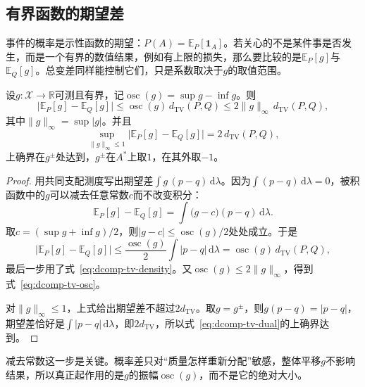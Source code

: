 \subsection{有界函数的期望差}
\label{sec:dcomp-tv-functions}

事件的概率是示性函数的期望：$P(A)=\mathbb{E}_{P}[\mathbf{1}_{A}]$。若关心的不是某件事是否发生，而是一个有界的数值结果，例如有上限的损失，那么要比较的是$\mathbb{E}_{P}[g]$与$\mathbb{E}_{Q}[g]$。总变差同样能控制它们，只是系数取决于$g$的取值范围。

\begin{theorem}[有界函数的期望差]
\label{thm:dcomp-tv-bounded}
设$g:\mathcal{X}\to\mathbb{R}$可测且有界，记$\operatorname{osc}(g)=\sup g-\inf g$。则
\begin{equation}
 \bigl\lvert\mathbb{E}_{P}[g]-\mathbb{E}_{Q}[g]\bigr\rvert\leq\operatorname{osc}(g)\,d_{\mathrm{TV}}(P,Q)\leq2\lVert g\rVert_{\infty}\,d_{\mathrm{TV}}(P,Q),
 \label{eq:dcomp-tv-osc}
\end{equation}
其中$\lVert g\rVert_{\infty}=\sup\lvert g\rvert$。并且
\begin{equation}
 \sup_{\lVert g\rVert_{\infty}\leq1}\bigl\lvert\mathbb{E}_{P}[g]-\mathbb{E}_{Q}[g]\bigr\rvert=2\,d_{\mathrm{TV}}(P,Q),
 \label{eq:dcomp-tv-dual}
\end{equation}
上确界在$g^{\pm}$处达到，$g^{\pm}$在$A^{*}$上取$1$，在其外取$-1$。
\end{theorem}

\begin{proof}
用共同支配测度写出期望差$\int g\,(p-q)\,\mathrm{d}\lambda$。因为$\int(p-q)\,\mathrm{d}\lambda=0$，被积函数中的$g$可以减去任意常数$c$而不改变积分：
\[
 \mathbb{E}_{P}[g]-\mathbb{E}_{Q}[g]=\int\bigl(g-c\bigr)(p-q)\,\mathrm{d}\lambda .
\]
取$c=(\sup g+\inf g)/2$，则$\lvert g-c\rvert\leq\operatorname{osc}(g)/2$处处成立。于是
\[
 \bigl\lvert\mathbb{E}_{P}[g]-\mathbb{E}_{Q}[g]\bigr\rvert\leq\frac{\operatorname{osc}(g)}{2}\int\lvert p-q\rvert\,\mathrm{d}\lambda=\operatorname{osc}(g)\,d_{\mathrm{TV}}(P,Q),
\]
最后一步用了式~\eqref{eq:dcomp-tv-density}。又$\operatorname{osc}(g)\leq2\lVert g\rVert_{\infty}$，得到式~\eqref{eq:dcomp-tv-osc}。

对$\lVert g\rVert_{\infty}\leq1$，上式给出期望差不超过$2d_{\mathrm{TV}}$。取$g=g^{\pm}$，则$g(p-q)=\lvert p-q\rvert$，期望差恰好是$\int\lvert p-q\rvert\,\mathrm{d}\lambda$，即$2d_{\mathrm{TV}}$，所以式~\eqref{eq:dcomp-tv-dual}的上确界达到。
\end{proof}

减去常数这一步是关键。概率差只对“质量怎样重新分配”敏感，整体平移$g$不影响结果，所以真正起作用的是$g$的振幅$\operatorname{osc}(g)$，而不是它的绝对大小。

